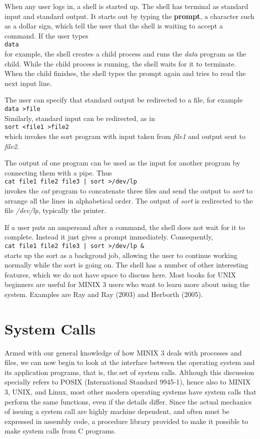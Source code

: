 \documentclass{book}
\newcommand {\kw}  [1] {\textbf{#1}}
\newcommand {\sys} [1] {\textsl{#1}}
\newcommand {\cmd} [1] {\texttt{#1}}
\begin{document}
When any user logs in, a shell is started up.
The shell has terminal as standard input and standard output.
It starts out by typing the \kw{prompt}, a character such as a dollar sign, 
which tell the user that the shell is waiting to accept a command.
If the user types\\
\cmd{data}\\
for example, the shell creates a child process and runs the \sys{data} program as the child.
While the child process is running, the shell waits for it to terminate.
When the child finishes, the shell types the prompt again and tries to read the next input line.

The user can specify that standard output be redirected to a file, for example\\
\cmd{data >file}\\
Similarly, standard input can be redirected, as in\\
\cmd{sort <file1 >file2}\\
which invokes the sort program with input taken from \sys{file1} and output sent to \sys{file2}.

The output of one program can be used as the input for another program by connecting them with a pipe. Thus\\
\cmd{cat file1 file2 file3 | sort >/dev/lp}\\
invokes the \sys{cat} program to concatenate three files and send the output to \sys{sort} to arrange all the lines in alphabetical order.
The output of \sys{sort} is redirected to the file \sys{/dev/lp}, typically the printer.

If a user puts an ampersand after a command, the shell does not wait for it to complete.
Instead it just gives a prompt immediately. Consequently,\\
\cmd{cat file1 file2 file3 | sort >/dev/lp \&}\\
starts up the sort as a backgroud job, allowing the user to continue working normally while the sort is going on.
The shell has a number of other interesting features, which we do not have space to discuss here.
Most books for UNIX beginners are useful for MINIX 3 users who want to learn more about using the system.
Examples are Ray and Ray (2003) and Herborth (2005).

\section{System Calls}
Armed with our general knowledge of how MINIX 3 deals with processes and files, 
we can now begin to look at the interface between the operating system and its application programs, that is, the set of system calls.
Although this discussion specially refers to POSIX (International Standard 9945-1), hence also to MINIX 3, UNIX, and Linux, 
most other modern operating systems have system calls that perform the same functions, even if the details differ.
Since the actual mechanics of issuing a system call are highly machine dependent, and often must be expressed in assembly code, 
a procedure library provided to make it possible to make system calls from C programs.
\end{document}

